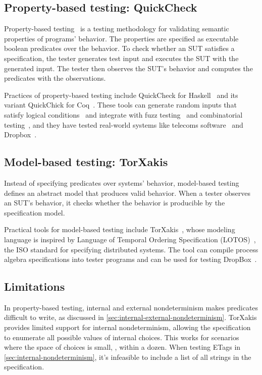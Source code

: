 \subsection{Property-based testing: QuickCheck}
Property-based testing~\cite{pbt} is a testing methodology for validating
semantic properties of programs' behavior.  The properties are specified as
executable boolean predicates over the behavior.  To check whether an SUT
satisfies a specification, the tester generates test input and executes the SUT
with the generated input.  The tester then observes the SUT's behavior and
computes the predicates with the observations.

Practices of property-based testing include QuickCheck for Haskell~\cite{qc} and
its variant QuickChick for Coq~\cite{quickchick}.  These tools can generate
random inputs that satisfy logical conditions~\cite{gengood} and integrate with
fuzz testing~\cite{fuzzchick} and combinatorial testing~\cite{judge-cover}, and
they have tested real-world systems like telecoms software~\cite{Quviq2006} and
Dropbox~\cite{testing-dropbox}.

\subsection{Model-based testing: TorXakis}
Instead of specifying predicates over systems' behavior, model-based
testing~\cite{broy2005model} defines an abstract model that produces valid behavior.  When
a tester observes an SUT's behavior, it checks whether the behavior is
producible by the specification model.

Practical tools for model-based testing include TorXakis~\cite{TorXakis}, whose
modeling language is inspired by Language of Temporal Ordering Specification
(LOTOS)~\cite{lotos}, the ISO standard for specifying distributed systems.  The
tool can compile process algebra specifications into tester programs and can be
used for testing DropBox~\cite{torxakis-dropbox}.

\subsection{Limitations}
In property-based testing, internal and external nondeterminism makes predicates
difficult to write, as discussed
in \autoref{sec:internal-external-nondeterminism}.  TorXakis provides limited
support for internal nondeterminism, allowing the specification to enumerate all
possible values of internal choices.  This works for scenarios where the space
of choices is small, \eg, within a dozen.  When testing ETags
in \autoref{sec:internal-nondeterminism}, it's infeasible to include a list of
all strings in the specification.

